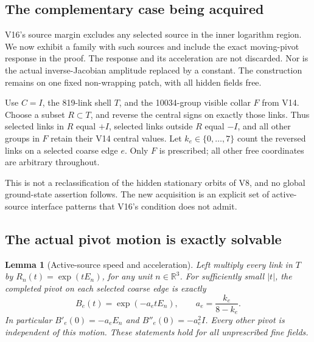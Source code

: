 \documentclass[11pt,oneside]{article}
\newtheorem{lemma}[theorem]{Lemma}
\begin{document}
\subsection{The complementary case being acquired}

V16's source margin excludes any selected source in the
inner logarithm region. We now exhibit a family with such
sources and include the exact moving-pivot response in
the proof. The response and its acceleration are not
discarded. Nor is the actual inverse-Jacobian amplitude
replaced by a constant. The construction remains on one
fixed non-wrapping patch, with all hidden fields free.

Use \(C=I\), the 819-link shell \(T\), and the
10034-group visible collar \(F\) from V14.
Choose a subset \(R\subset T\), and reverse the central
signs on exactly those links. Thus selected links in
\(R\) equal \(+I\), selected links outside \(R\) equal
\(-I\), and all other groups in \(F\) retain their V14
central values. Let \(k_e\in\{0,\ldots,7\}\) count the
reversed links on a selected coarse edge \(e\).
Only \(F\) is prescribed; all other free coordinates
are arbitrary throughout.

This is not a reclassification of the hidden stationary
orbits of V8, and no global ground-state assertion follows.
The new acquisition is an explicit set of active-source
interface patterns that V16's condition does not admit.

\subsection{The actual pivot motion is exactly solvable}

\begin{lemma}[Active-source speed and acceleration]
\label{lem:f13v17-pivot}
Left multiply every link in \(T\) by
\(R_n(t)=\exp(tE_n)\), for any unit \(n\in\mathbb R^3\).
For sufficiently small \(|t|\), the completed pivot on
each selected coarse edge is exactly
\begin{equation}\label{eq:f13v17-pivot}
 B_e(t)=\exp(-a_e tE_n),\qquad
          a_e=\frac{k_e}{8-k_e}.
\end{equation}
In particular \(B'_e(0)=-a_eE_n\) and
\(B''_e(0)=-a_e^2I\). Every other pivot is independent
of this motion. These statements hold for all
unprescribed fine fields.
\end{lemma}
\end{document}
